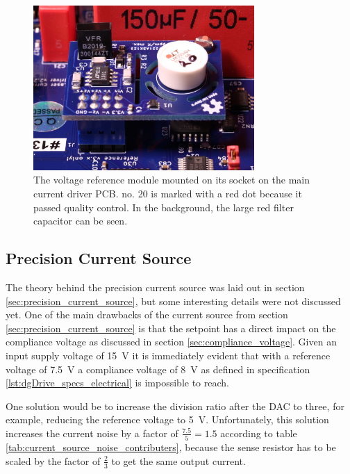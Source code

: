 \begin{figure}[hb]
    \centering
    \includegraphics[width=0.75\textwidth]{images/BM1A6694_reference_15V_lowres.JPG}
    \caption{The voltage reference module mounted on its socket on the main current driver PCB.  no. 20 is marked with a red dot because it passed quality control. In the background, the large red filter capacitor can be seen.}
    \label{fig:reference_module_pcb}
\end{figure}

\subsection{Precision Current Source}
\label{sec:results_precision_current_source}
The theory behind the precision current source was laid out in section \ref{sec:precision_current_source}, but some interesting details were not discussed yet. One of the main drawbacks of the current source from section \ref{sec:precision_current_source} is that the setpoint has a direct impact on the compliance voltage as discussed in section \ref{sec:compliance_voltage}. Given an input supply voltage of \qty{15}{\V} it is immediately evident that with a reference voltage of \qty{7.5}{\V} a compliance voltage of \qty{8}{\V} as defined in specification \ref{lst:dgDrive_specs_electrical} is impossible to reach.

One solution would be to increase the division ratio after the DAC to three, for example, reducing the reference voltage to \qty{5}{\V}. Unfortunately, this solution increases the current noise by a factor of $\frac{7.5}{5} = 1.5$ according to table \ref{tab:current_source_noise_contributers}, because the sense resistor has to be scaled by the factor of $\frac{2}{3}$ to get the same output current.

